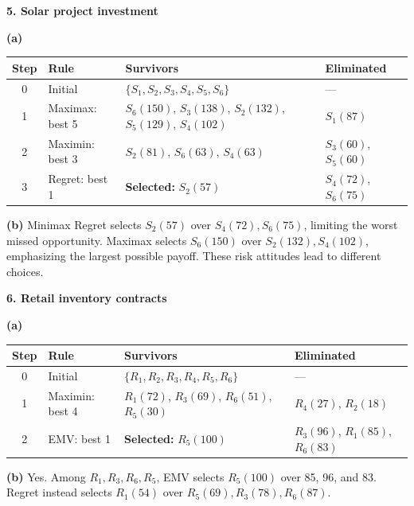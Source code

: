 \begin{studentproblem}
\textbf{5. Solar project investment}\par
\textbf{(a)}
\begin{center}
\small
\begin{tabularx}{\textwidth}{@{}c >{\raggedright\arraybackslash}X >{\raggedright\arraybackslash}p{} >{\raggedright\arraybackslash}p{}@{}}
\toprule
Step & Rule & Survivors & Eliminated \\
\midrule
0 & Initial & $\{S_1,S_2,S_3,S_4,S_5,S_6\}$ & --- \\
1 & Maximax: best 5 & $S_6(150)$, $S_3(138)$, $S_2(132)$, $S_5(129)$, $S_4(102)$ & $S_1(87)$ \\
2 & Maximin: best 3 & $S_2(81)$, $S_6(63)$, $S_4(63)$ & $S_3(60)$, $S_5(60)$ \\
3 & Regret: best 1 & \textbf{Selected:} $S_2(57)$ & $S_4(72)$, $S_6(75)$ \\
\bottomrule
\end{tabularx}
\end{center}
\textbf{(b)} Minimax Regret selects $S_2(57)$ over $S_4(72),S_6(75)$, limiting the worst missed opportunity. Maximax selects $S_6(150)$ over $S_2(132),S_4(102)$, emphasizing the largest possible payoff. These risk attitudes lead to different choices.
\end{studentproblem}

\begin{studentproblem}
\textbf{6. Retail inventory contracts}\par
\textbf{(a)}
\begin{center}
\small
\begin{tabularx}{\textwidth}{@{}c >{\raggedright\arraybackslash}X >{\raggedright\arraybackslash}p{} >{\raggedright\arraybackslash}p{}@{}}
\toprule
Step & Rule & Survivors & Eliminated \\
\midrule
0 & Initial & $\{R_1,R_2,R_3,R_4,R_5,R_6\}$ & --- \\
1 & Maximin: best 4 & $R_1(72)$, $R_3(69)$, $R_6(51)$, $R_5(30)$ & $R_4(27)$, $R_2(18)$ \\
2 & EMV: best 1 & \textbf{Selected:} $R_5(100)$ & $R_3(96)$, $R_1(85)$, $R_6(83)$ \\
\bottomrule
\end{tabularx}
\end{center}
\textbf{(b)} Yes. Among $R_1,R_3,R_6,R_5$, EMV selects $R_5(100)$ over 85, 96, and 83. Regret instead selects $R_1(54)$ over $R_5(69),R_3(78),R_6(87)$.
\end{studentproblem}

